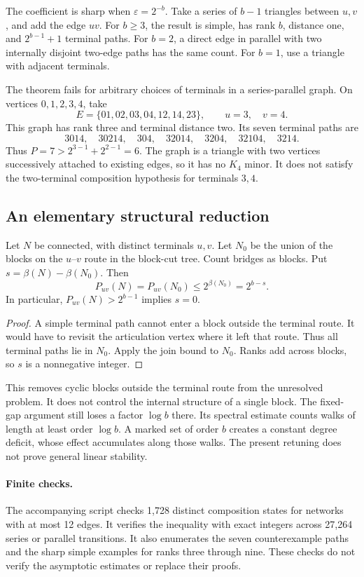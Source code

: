 The coefficient is sharp when $\varepsilon=2^{-b}$.
Take a series of $b-1$ triangles between $u,v$, and add the edge $uv$.
For $b\ge3$, the result is simple, has rank $b$, distance one, and $2^{b-1}+1$ terminal paths.
For $b=2$, a direct edge in parallel with two internally disjoint two-edge paths has the same count.
For $b=1$, use a triangle with adjacent terminals.

The theorem fails for arbitrary choices of terminals in a series-parallel graph.
On vertices $0,1,2,3,4$, take
\[
 E=\{01,02,03,04,12,14,23\},\qquad u=3,\quad v=4.
\]
This graph has rank three and terminal distance two.
Its seven terminal paths are
\[
 3014,\quad30214,\quad304,\quad32014,\quad3204,\quad32104,\quad3214.
\]
Thus $P=7>2^{3-1}+2^{2-1}=6$.
The graph is a triangle with two vertices successively attached to existing edges, so it has no $K_4$ minor.
It does not satisfy the two-terminal composition hypothesis for terminals $3,4$.

\subsection{An elementary structural reduction}

\begin{proposition}\label{prop:research-offroute}
Let $N$ be connected, with distinct terminals $u,v$.
Let $N_0$ be the union of the blocks on the $u$--$v$ route in the block-cut tree.
Count bridges as blocks.
Put $s=\beta(N)-\beta(N_0)$.
Then
\[
 P_{uv}(N)=P_{uv}(N_0)\le2^{\beta(N_0)}=2^{b-s}.
\]
In particular, $P_{uv}(N)>2^{b-1}$ implies $s=0$.
\end{proposition}

\begin{proof}
A simple terminal path cannot enter a block outside the terminal route.
It would have to revisit the articulation vertex where it left that route.
Thus all terminal paths lie in $N_0$.
Apply the join bound to $N_0$.
Ranks add across blocks, so $s$ is a nonnegative integer.
\end{proof}

This removes cyclic blocks outside the terminal route from the unresolved problem.
It does not control the internal structure of a single block.
The fixed-gap argument still loses a factor $\log b$ there.
Its spectral estimate counts walks of length at least order $\log b$.
A marked set of order $b$ creates a constant degree deficit, whose effect accumulates along those walks.
The present retuning does not prove general linear stability.

\paragraph{Finite checks.}
The accompanying script checks 1,728 distinct composition states for networks with at most 12 edges.
It verifies the inequality with exact integers across 27,264 series or parallel transitions.
It also enumerates the seven counterexample paths and the sharp simple examples for ranks three through nine.
These checks do not verify the asymptotic estimates or replace their proofs.
